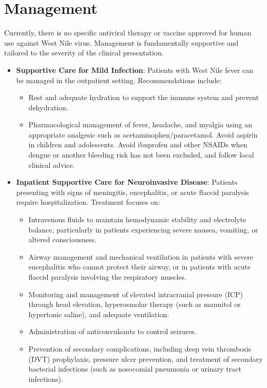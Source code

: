 \section*{Management}
Currently, there is no specific antiviral therapy or vaccine approved for human use against West Nile virus. Management is fundamentally supportive and tailored to the severity of the clinical presentation.
\begin{itemize}
    \item \textbf{Supportive Care for Mild Infection}: Patients with West Nile fever can be managed in the outpatient setting. Recommendations include:
    \begin{itemize}
        \item Rest and adequate hydration to support the immune system and prevent dehydration.
        \item Pharmacological management of fever, headache, and myalgia using an appropriate analgesic such as acetaminophen/paracetamol. Avoid aspirin in children and adolescents. Avoid ibuprofen and other NSAIDs when dengue or another bleeding risk has not been excluded, and follow local clinical advice.
    \end{itemize}
    \item \textbf{Inpatient Supportive Care for Neuroinvasive Disease}: Patients presenting with signs of meningitis, encephalitis, or acute flaccid paralysis require hospitalization. Treatment focuses on:
    \begin{itemize}
        \item Intravenous fluids to maintain hemodynamic stability and electrolyte balance, particularly in patients experiencing severe nausea, vomiting, or altered consciousness.
        \item Airway management and mechanical ventilation in patients with severe encephalitis who cannot protect their airway, or in patients with acute flaccid paralysis involving the respiratory muscles.
        \item Monitoring and management of elevated intracranial pressure (ICP) through head elevation, hyperosmolar therapy (such as mannitol or hypertonic saline), and adequate ventilation.
        \item Administration of anticonvulsants to control seizures.
        \item Prevention of secondary complications, including deep vein thrombosis (DVT) prophylaxis, pressure ulcer prevention, and treatment of secondary bacterial infections (such as nosocomial pneumonia or urinary tract infections).

\end{itemize}
\end{itemize}
